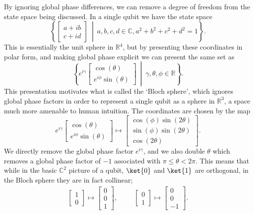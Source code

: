 By ignoring global phase differences, we can remove a degree of freedom from the state space being discussed. In a single qubit we have the state space
\[\left\{\begin{bmatrix}a+ib \\ c+id\end{bmatrix}\ \middle|\ a, b, c, d \in \mathbb{C}, a^2+b^2+c^2+d^2 = 1\right\}.\]
This is essentially the unit sphere in $\mathbb{R}^4$, but by presenting these coordinates in polar form, and making global phase explicit we can present the same set as
\[\left\{e^{i\gamma}\begin{bmatrix}\cos(\theta) \\ e^{i\phi}\sin(\theta)\end{bmatrix}\ \middle|\ \gamma, \theta, \phi \in \mathbb{R}\right\}.\]
This presentation motivates what is called the `Bloch sphere', which ignores global phase factors in order to represent a single qubit as a sphere in $\mathbb{R}^3$, a space much more amenable to human intuition. The coordinates are chosen by the map
\[e^{i\gamma}\begin{bmatrix}\cos(\theta) \\ e^{i\phi}\sin(\theta)\end{bmatrix} \mapsto
\begin{bmatrix}\cos(\phi)\sin(2\theta) \\ \sin(\phi)\sin(2\theta) \\ \cos(2\theta)\end{bmatrix}.\]
We directly remove the global phase factor $e^{i\gamma}$, and we also double $\theta$ which removes a global phase factor of $-1$ associated with $\pi \leq \theta < 2\pi$. This means that while in the basic $\mathbb{C}^2$ picture of a qubit, $\ket{0}$ and $\ket{1}$ are orthogonal, in the Bloch sphere they are in fact collinear;
\begin{align*}
\begin{bmatrix}1 \\ 0\end{bmatrix} \mapsto \begin{bmatrix}0\\0\\1\end{bmatrix},
&&&
\begin{bmatrix}0 \\ 1\end{bmatrix} \mapsto \begin{bmatrix}0\\0\\-1\end{bmatrix}.
\end{align*}
